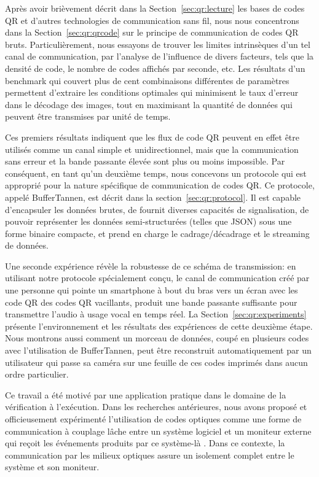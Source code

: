 Après avoir brièvement décrit dans la Section~\ref{sec:qr:lecture} les bases de codes QR et d'autres technologies de communication sans fil, nous nous concentrons dans la Section~\ref{sec:qr:qrcode} sur le principe de communication de codes QR bruts. Particulièrement, nous essayons de trouver les limites intrinsèques d'un tel canal de communication, par l'analyse de l'influence de divers facteurs, tels que la densité de code, le nombre de codes affichés par seconde, etc. Les résultats d'un benchmark qui couvert plus de cent combinaisons différentes de paramètres permettent d'extraire les conditions optimales qui minimisent le taux d'erreur dans le décodage des images, tout en maximisant la quantité de données qui peuvent être transmises par unité de temps.

Ces premiers résultats indiquent que les flux de code QR peuvent en effet être utilisés comme un canal simple et unidirectionnel, mais que la communication sans erreur et la bande passante élevée sont plus ou moins impossible. Par conséquent, en tant qu'un deuxième temps, nous concevons un protocole qui est approprié pour la nature spécifique de communication de codes QR. Ce protocole, appelé BufferTannen, est décrit dans la section~\ref{sec:qr:protocol}. Il est capable d'encapsuler les données brutes, de fournit diverses capacités de signalisation, de pouvoir représenter les données semi-structurées (telles que JSON) sous une forme binaire compacte, et prend en charge le cadrage/décadrage et le streaming de données.

Une seconde expérience révèle la robustesse de ce schéma de transmission: en utilisant notre protocole spécialement conçu, le canal de communication créé par une personne qui pointe un smartphone à bout du bras vers un écran avec les code QR des codes QR vacillants, produit une bande passante suffisante pour transmettre l'audio à usage vocal en temps réel. La Section~\ref{sec:qr:experiments} présente l'environnement et les résultats des expériences de cette deuxième étape. Nous montrons aussi comment un morceau de données, coupé en plusieurs codes avec l'utilisation de BufferTannen, peut être reconstruit automatiquement par un utilisateur qui passe sa caméra sur une feuille de ces codes imprimés dans aucun ordre particulier.

Ce travail a été motivé par une application pratique dans le domaine de la vérification à l'exécution. Dans les recherches antérieures, nous avons proposé et officieusement expérimenté l'utilisation de codes optiques comme une forme de communication à couplage lâche entre un système logiciel et un moniteur externe qui reçoit les événements produits par ce système-là \citep{DBLP_conf/rv/LavoieLVGH14}. Dans ce contexte, la communication par les milieux optiques assure un isolement complet entre le système et son moniteur.

